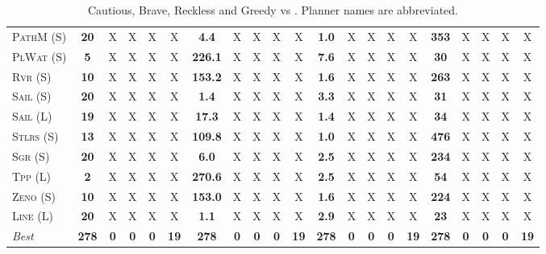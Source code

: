 \documentclass[11pt,landscape]{article}
\begin{document}
\begin{table}[tb]
{\begin{tabular}{|l||ccccc||ccccc||ccccc||ccccc||}
\textsc{PathM} (S)&\textbf{20}&X&X&X&X&\textbf{4.4}&X&X&X&X&\textbf{1.0}&X&X&X&X&\textbf{353}&X&X&X&X\\
\textsc{PlWat} (S)&\textbf{5}&X&X&X&X&\textbf{226.1}&X&X&X&X&\textbf{7.6}&X&X&X&X&\textbf{30}&X&X&X&X\\
\textsc{Rvr} (S)&\textbf{10}&X&X&X&X&\textbf{153.2}&X&X&X&X&\textbf{1.6}&X&X&X&X&\textbf{263}&X&X&X&X\\
\textsc{Sail} (S)&\textbf{20}&X&X&X&X&\textbf{1.4}&X&X&X&X&\textbf{3.3}&X&X&X&X&\textbf{31}&X&X&X&X\\
\textsc{Sail} (L)&\textbf{19}&X&X&X&X&\textbf{17.3}&X&X&X&X&\textbf{1.4}&X&X&X&X&\textbf{34}&X&X&X&X\\
\textsc{Stlrs} (S)&\textbf{13}&X&X&X&X&\textbf{109.8}&X&X&X&X&\textbf{1.0}&X&X&X&X&\textbf{476}&X&X&X&X\\
\textsc{Sgr} (S)&\textbf{20}&X&X&X&X&\textbf{6.0}&X&X&X&X&\textbf{2.5}&X&X&X&X&\textbf{234}&X&X&X&X\\
\textsc{Tpp} (L)&\textbf{2}&X&X&X&X&\textbf{270.6}&X&X&X&X&\textbf{2.5}&X&X&X&X&\textbf{54}&X&X&X&X\\
\textsc{Zeno} (S)&\textbf{10}&X&X&X&X&\textbf{153.0}&X&X&X&X&\textbf{1.6}&X&X&X&X&\textbf{224}&X&X&X&X\\
\textsc{Line} (L)&\textbf{20}&X&X&X&X&\textbf{1.1}&X&X&X&X&\textbf{2.9}&X&X&X&X&\textbf{23}&X&X&X&X
\\\hline
\textit{Best}&\textbf{278}&\textbf{0}&\textbf{0}&\textbf{0}&\textbf{19}&\textbf{278}&\textbf{0}&\textbf{0}&\textbf{0}&\textbf{19}&\textbf{278}&\textbf{0}&\textbf{0}&\textbf{0}&\textbf{19}&\textbf{278}&\textbf{0}&\textbf{0}&\textbf{0}&\textbf{19}\\\hline

        \end{tabular}}
        \caption{Cautious, Brave, Reckless and Greedy \pattyd vs \pattyo. Planner names are abbreviated.}
        \label{tab:cbrg}
        \end{table}
        
\end{document}
